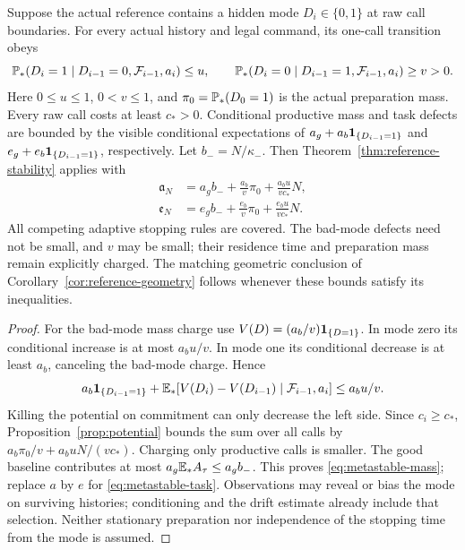 \begin{theorem}\label{thm:metastable}
Suppose the actual reference contains a hidden mode $D_i\in\{0,1\}$ at raw call boundaries. For every actual history and legal command, its one-call transition obeys
\[
 \mathbb P_*(D_i=1\mid D_{i-1}=0,\mathcal F_{i-1},a_i)\le u,
 \qquad
 \mathbb P_*(D_i=0\mid D_{i-1}=1,\mathcal F_{i-1},a_i)\ge v>0.
\]
Here $0\le u\le1$, $0<v\le1$, and $\pi_0=\mathbb P_*(D_0=1)$ is the actual preparation mass. Every raw call costs at least $c_*>0$. Conditional productive mass and task defects are bounded by the visible conditional expectations of
$a_g+a_b\mathbf1_{\{D_{i-1}=1\}}$ and
$e_g+e_b\mathbf1_{\{D_{i-1}=1\}}$, respectively. Let $b_-=N/\kappa_-$. Then Theorem~\ref{thm:reference-stability} applies with
\begin{align}
 \mathfrak a_N&=a_gb_-+\frac{a_b}{v}\pi_0+
                         \frac{a_bu}{vc_*}N,\label{eq:metastable-mass}\\
 \mathfrak e_N&=e_gb_-+\frac{e_b}{v}\pi_0+
                         \frac{e_bu}{vc_*}N.\label{eq:metastable-task}
\end{align}
All competing adaptive stopping rules are covered. The bad-mode defects need not be small, and $v$ may be small; their residence time and preparation mass remain explicitly charged. The matching geometric conclusion of Corollary~\ref{cor:reference-geometry} follows whenever these bounds satisfy its inequalities.
\end{theorem}
\begin{proof}
For the bad-mode mass charge use $V(D)=(a_b/v)\mathbf1_{\{D=1\}}$. In mode zero its conditional increase is at most $a_bu/v$. In mode one its conditional decrease is at least $a_b$, canceling the bad-mode charge. Hence
\[
 a_b\mathbf1_{\{D_{i-1}=1\}}+\mathbb E_*[V(D_i)-V(D_{i-1})\mid\mathcal F_{i-1},a_i]
 \le a_bu/v.
\]
Killing the potential on commitment can only decrease the left side. Since $c_i\ge c_*$, Proposition~\ref{prop:potential} bounds the sum over all calls by $a_b\pi_0/v+a_buN/(vc_*)$. Charging only productive calls is smaller. The good baseline contributes at most $a_g\mathbb E_*A_\tau\le a_gb_-$. This proves \eqref{eq:metastable-mass}; replace $a$ by $e$ for \eqref{eq:metastable-task}. Observations may reveal or bias the mode on surviving histories; conditioning and the drift estimate already include that selection. Neither stationary preparation nor independence of the stopping time from the mode is assumed.
\end{proof}

